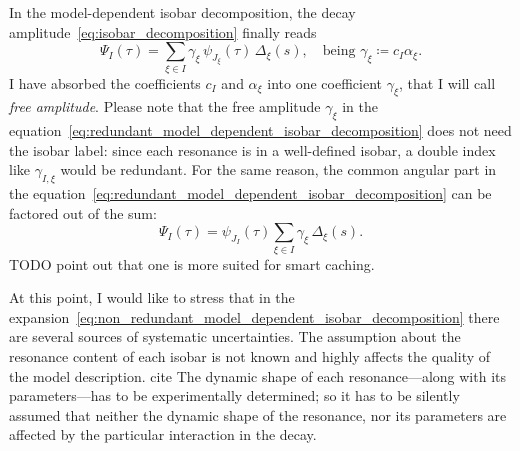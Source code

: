     In the model-dependent isobar decomposition, the decay amplitude~\eqref{eq:isobar_decomposition} finally reads
    \begin{equation}\label{eq:redundant_model_dependent_isobar_decomposition}
        \Psi_I(\tau) =  \sum_{\xi\in I} \gamma_\xi \,\psi_{J_\xi}\!(\tau)\,\Delta_{\xi}(s),\quad
        \text{being }
        \gamma_\xi\coloneqq c_I \alpha_{\xi}.
    \end{equation}
    I have absorbed the coefficients $c_I$ and $\alpha_\xi$ into one coefficient $\gamma_{\xi}$, that I will call \emph{free amplitude}.
    Please note that the free amplitude $\gamma_\xi$ in the equation~\eqref{eq:redundant_model_dependent_isobar_decomposition} does not need the isobar label: since each resonance is in a well-defined isobar, a double index like $\gamma_{I,\xi}$ would be redundant.
    For the same reason, the common angular part in the equation~\eqref{eq:redundant_model_dependent_isobar_decomposition} can be factored out of the sum:
    \begin{equation}\label{eq:non_redundant_model_dependent_isobar_decomposition}
        \Psi_I(\tau) =  \psi_{J_I}\!(\tau)\sum_{\xi\in I} \gamma_\xi \,\Delta_{\xi}(s).
    \end{equation}
    {\color{red} TODO point out that one is more suited for smart caching.}




    At this point, I would like to stress that in the expansion~\eqref{eq:non_redundant_model_dependent_isobar_decomposition} there are several sources of systematic uncertainties.
    The assumption about the resonance content of each isobar is not known and highly affects the quality of the model description. {\color{red} cite \cite{PhysRevD.76.012001}}
    The dynamic shape of each resonance---along with its parameters---has to be experimentally determined; so it has to be silently assumed that neither the dynamic shape of the resonance, nor its parameters are affected by the particular interaction in the decay.



